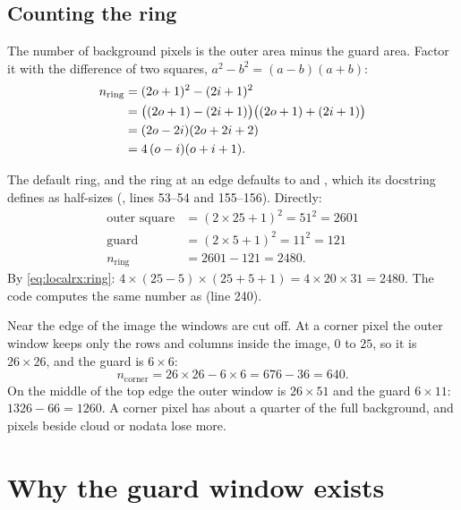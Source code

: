 \subsection{Counting the ring}

The number of background pixels is the outer area minus the guard area. Factor it with the
difference of two squares, $a^2 - b^2 = (a - b)(a + b)$:
\begin{align}
n_{\text{ring}} &= (2o + 1)^2 - (2i + 1)^2 \notag\\
&= \big((2o + 1) - (2i + 1)\big)\big((2o + 1) + (2i + 1)\big) \notag\\
&= (2o - 2i)(2o + 2i + 2) \notag\\
&= 4\,(o - i)(o + i + 1). \label{eq:localrx:ring}
\end{align}

\begin{worked}[label={we:localrx:count}]{The default ring, and the ring at an edge}
 defaults to  and , which its
docstring defines as half-sizes (, lines 53--54 and 155--156).
Directly:
\begin{align*}
\text{outer square} &= (2\times25 + 1)^2 = 51^2 = 2601\\
\text{guard} &= (2\times5 + 1)^2 = 11^2 = 121\\
n_{\text{ring}} &= 2601 - 121 = 2480 .
\end{align*}
By \cref{eq:localrx:ring}: $4\times(25 - 5)\times(25 + 5 + 1) = 4\times20\times31 = 2480$. The code
computes the same number as  (line 240).

Near the edge of the image the windows are cut off. At a corner pixel the outer window keeps only the
rows and columns inside the image, $0$ to $25$, so it is $26\times26$, and the guard is $6\times6$:
\[
n_{\text{corner}} = 26\times26 - 6\times6 = 676 - 36 = 640 .
\]
On the middle of the top edge the outer window is $26\times51$ and the guard $6\times11$:
$1326 - 66 = 1260$. A corner pixel has about a quarter of the full background, and pixels beside
cloud or nodata lose more.
\end{worked}

\section{Why the guard window exists}\label{sec:localrx:guard}

